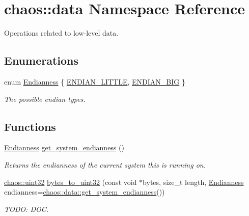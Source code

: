 \hypertarget{namespacechaos_1_1data}{\section{chaos\-:\-:data Namespace Reference}
\label{namespacechaos_1_1data}
}


Operations related to low-\/level data.  


\subsection*{Enumerations}
\begin{DoxyCompactItemize}
\item 
enum \hyperlink{namespacechaos_1_1data_adb2657d50c0b84cdc1153001031bbf3f}{Endianness} \{ \hyperlink{namespacechaos_1_1data_adb2657d50c0b84cdc1153001031bbf3fa7fc5455bb6147c278dfa4a84e255c66d}{E\-N\-D\-I\-A\-N\-\_\-\-L\-I\-T\-T\-L\-E}, 
\hyperlink{namespacechaos_1_1data_adb2657d50c0b84cdc1153001031bbf3fa0e1ed99b965cedefe24534be309738ad}{E\-N\-D\-I\-A\-N\-\_\-\-B\-I\-G}
 \}
\begin{DoxyCompactList}\small\item\em The possible endian types. \end{DoxyCompactList}\end{DoxyCompactItemize}
\subsection*{Functions}
\begin{DoxyCompactItemize}
\item 
\hypertarget{namespacechaos_1_1data_a853118d28d026784faad6673bbcf526f}{\hyperlink{namespacechaos_1_1data_adb2657d50c0b84cdc1153001031bbf3f}{Endianness} \hyperlink{namespacechaos_1_1data_a853118d28d026784faad6673bbcf526f}{get\-\_\-system\-\_\-endianness} ()}\label{namespacechaos_1_1data_a853118d28d026784faad6673bbcf526f}

\begin{DoxyCompactList}\small\item\em Returns the endianness of the current system this is running on. \end{DoxyCompactList}\item 
\hypertarget{namespacechaos_1_1data_acb302083553072deedf6162f524113e2}{\hyperlink{namespacechaos_a3b3a47ba1e284655bf1a30c441121c60}{chaos\-::uint32} \hyperlink{namespacechaos_1_1data_acb302083553072deedf6162f524113e2}{bytes\-\_\-to\-\_\-uint32} (const void $\ast$bytes, size\-\_\-t length, \hyperlink{namespacechaos_1_1data_adb2657d50c0b84cdc1153001031bbf3f}{Endianness} endianness=\hyperlink{namespacechaos_1_1data_a853118d28d026784faad6673bbcf526f}{chaos\-::data\-::get\-\_\-system\-\_\-endianness}())}\label{namespacechaos_1_1data_acb302083553072deedf6162f524113e2}

\begin{DoxyCompactList}\small\item\em T\-O\-D\-O\-: D\-O\-C. \end{DoxyCompactList}\end{DoxyCompactItemize}


